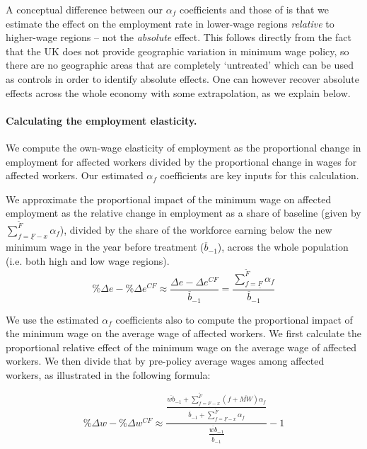 A conceptual difference between our $\alpha_f$ coefficients and those of \cite{Cengiz2019} is that we estimate the effect on the employment rate in lower-wage regions \textit{relative} to higher-wage regions -- not the \textit{absolute} effect. This follows directly from the fact that the UK does not provide geographic variation in minimum wage policy, so there are no geographic areas that are completely `untreated' which can be used as controls in order to identify absolute effects. One can however recover absolute effects across the whole economy with some extrapolation, as we explain below.\par


\paragraph{Calculating the employment elasticity.} We compute the own-wage elasticity of employment as the proportional change in employment for affected workers divided by the proportional change in wages for affected workers. Our estimated $\alpha_f$ coefficients are key inputs for this calculation. \par

We approximate the proportional impact of the minimum wage on affected employment as the relative change in employment as a share of baseline (given by $\sum_{f=\underline{F}-x}^{\tilde{F}} \alpha_f$), divided by the share of the workforce earning below the new minimum wage in the year before treatment ($\overline{b}_{-1}$), across the whole population (i.e. both high and low wage regions). 
\begin{equation} \label{eq:emp_change}
    \%\Delta e - \%\Delta e^{CF} \approx \dfrac{\Delta e - \Delta e^{CF}}{\overline{b}_{-1}} = \dfrac{\sum_{f=\underline{F}}^{\tilde{F}} \alpha_f}{\overline{b}_{-1}}
\end{equation}

We use the estimated $\alpha_f$ coefficients also to compute the proportional impact of the minimum wage on the average wage of affected workers. We first calculate the proportional relative effect of the minimum wage on the average wage of affected workers. We then divide that by pre-policy average wages among affected workers, as illustrated in the following formula:

\begin{equation} \label{eq:wage_change}
	\%\Delta w - \%\Delta w^{CF} \approx \dfrac{\frac{\overline{wb}_{-1} + \sum_{f=\underline{F}-x}^{\tilde{F}}\left(f + \overline{MW}\right)\alpha_{f}}{\overline{b}_{-1} + \sum_{f=\underline{F}-x}^{\tilde{F}}\alpha_{f}}}{\frac{\overline{wb}_{-1}}{\overline{b}_{-1}}} - 1 
\end{equation}

